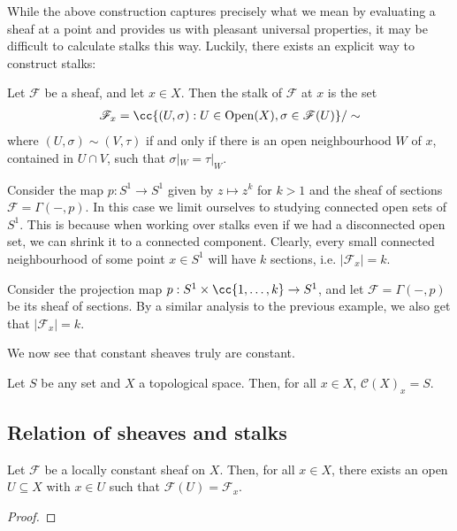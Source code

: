 \documentclass{article}
\begin{document}
While the above construction captures precisely what we mean by
evaluating a sheaf at a point and provides us with pleasant universal
properties, it may be difficult to calculate stalks this way. Luckily,
there exists an explicit way to construct stalks:

\begin{proposition}
  Let $\mathscr F$ be a sheaf, and let $x \in X$. Then the stalk of $\mathscr F$
  at $x$ is the set
  \begin{align*}
    \mathscr F_x = \cc{(U, \sigma) : U \in \Open(X), \sigma \in \mathscr F(U)} / \sim
  \end{align*}
  where $(U, \sigma) \sim (V, \tau)$ if and only if there is an open neighbourhood
  $W$ of $x$, contained in $U \cap V$, such that $\sigma|_W = \tau|_W$.
\end{proposition}

\begin{example}
  Consider the map $p:S^1\to S^1$ given by $z\mapsto z^k$ for $k > 1$ and the sheaf 
  of sections $\mathscr F = \Gamma(-, p)$. In this case we limit ourselves to 
  studying connected open sets of $S^1$. This is because when working over stalks
  even if we had a disconnected open set, we can shrink it to a connected component.
  Clearly, every small connected neighbourhood of some point $x \in S^1$ will have
  $k$ sections, i.e. $|\mathscr F_x| = k$. 
  \missingexample
\end{example}

\begin{example}
  Consider the projection map $p:S^1\times\cc{1,\ldots,k}\to S^1$, and let 
  $\mathscr F = \Gamma(-, p)$ be its sheaf of sections. By a similar analysis to 
  the previous example, we also get that $|\mathscr F_x| = k$.
  \missingexample
\end{example}

We now see that constant sheaves truly are constant.

\begin{example}
  Let $S$ be any set and $X$ a topological space. Then, for all
  $x\in X$, $\mathscr C(X)_x = S$.
\end{example}

\subsection{Relation of sheaves and stalks}

\begin{lemma}
  Let $\mathscr F$ be a locally constant sheaf on $X$. Then, for all $x\in X$,
  there exists an open $U\subseteq X$ with $x\in U$ such that $\mathscr
  F(U)=\mathscr F_x$.
  \begin{proof}
    \missingproof
  \end{proof}
\end{lemma}
\end{document}
